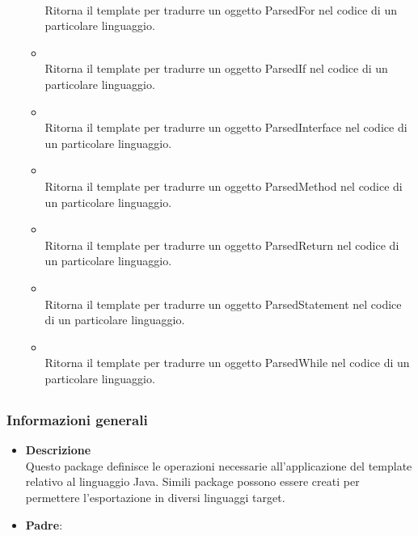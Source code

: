 \begin{itemize}
\begin{itemize}
\\ Ritorna il template per tradurre un oggetto ParsedFor nel codice di un particolare linguaggio.
\item {}
\\ Ritorna il template per tradurre un oggetto ParsedIf nel codice di un particolare linguaggio.
\item {}
\\ Ritorna il template per tradurre un oggetto ParsedInterface nel codice di un particolare linguaggio.
\item {}
\\ Ritorna il template per tradurre un oggetto ParsedMethod nel codice di un particolare linguaggio.
\item {}
\\ Ritorna il template per tradurre un oggetto ParsedReturn nel codice di un particolare linguaggio.
\item {}
\\ Ritorna il template per tradurre un oggetto ParsedStatement nel codice di un particolare linguaggio.
\item {}
\\ Ritorna il template per tradurre un oggetto ParsedWhile nel codice di un particolare linguaggio.
\end{itemize}
\end{itemize}
\subsection{}
\label{\nogloxy{swedesigner::server::template::java}}
\subsubsection{Informazioni generali}
\begin{itemize}
\item \textbf{Descrizione}\\
Questo package definisce le operazioni necessarie all'applicazione del template relativo al linguaggio Java. Simili package possono essere creati per permettere l'esportazione in diversi linguaggi target.
\item \textbf{Padre}: \hyperref[\nogloxy{swedesigner::server::template}]{}
\end{itemize}
